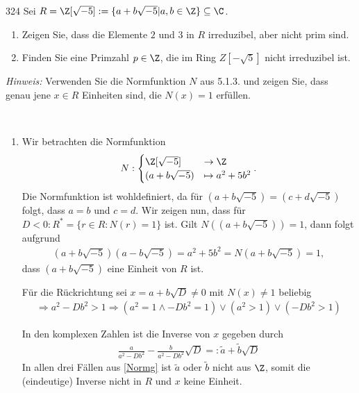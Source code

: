 \begin{algebraUE}{324}
Sei $R = \Z[\sqrt{-5}] := \{a + b\sqrt{-5} | a,b \in \Z\} \subseteq \C$.
\begin{enumerate}
  \item Zeigen Sie, dass die Elemente $2$ und $3$ in $R$ irreduzibel, aber nicht prim
  sind.
  \item Finden Sie eine Primzahl $p \in \Z$, die im Ring $Z[-\sqrt{5}]$ nicht irreduzibel ist.
\end{enumerate}
\textit{Hinweis:} Verwenden Sie die Normfunktion $N$ aus 5.1.3. und zeigen Sie,
dass genau jene $x \in R$ Einheiten sind, die $N(x) = 1$ erfüllen.
\end{algebraUE}
\begin{solution}
\leavevmode \\
\begin{enumerate}
  \item Wir betrachten die Normfunktion
  \begin{align*}
    N: \begin{cases}
      \Z[\sqrt{-5}] &\to \Z \\
      (a + b\sqrt{-5}) &\mapsto a^2 + 5b^2
    \end{cases}.
  \end{align*}
  Die Normfunktion ist wohldefiniert, da für $(a + b\sqrt{-5}) = (c + d\sqrt{-5})$
  folgt, dass $a = b$ und $c = d$.
  Wir zeigen nun, dass für $D < 0: R^* = \{r \in R: N(r) = 1\}$ ist. 
  Gilt $N((a + b\sqrt{-5}) ) = 1$, dann folgt aufgrund
  \begin{align*}
    (a + b\sqrt{-5})(a - b\sqrt{-5}) = a^2 + 5b^2 = N(a + b\sqrt{-5}) = 1,
  \end{align*}
  dass $(a + b\sqrt{-5})$ eine Einheit von $R$ ist.

  Für die Rückrichtung sei $x = a + b\sqrt{D} \neq 0$ mit $N(x) \neq 1$ beliebig
  \begin{align}\label{Normg}
    \Rightarrow a^2 - D b^2 > 1 \Rightarrow (a^2=1 \land -Db^2 = 1) \lor (a^2 > 1) \lor (-Db^2 > 1)
  \end{align}

  In den komplexen Zahlen ist die Inverse von $x$ gegeben durch
  \begin{align*}
    \frac{a}{a^2 - Db^2} - \frac{b}{a^2-Db^2}\sqrt{D} =: \tilde{a} + \tilde{b} \sqrt{D}
  \end{align*}
  In allen drei Fällen aus \eqref{Normg} ist $\tilde{a}$ oder $\tilde{b}$ nicht aus $\Z$, somit die (eindeutige) Inverse nicht in $R$ und $x$ keine Einheit.


\end{enumerate}
\end{solution}
